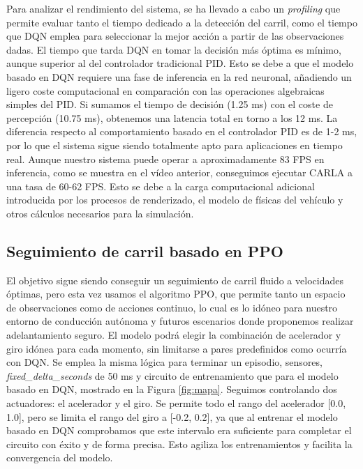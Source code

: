 Para analizar el rendimiento del sistema, se ha llevado a cabo un \textit{profiling} que permite evaluar tanto el tiempo dedicado a la detección del carril, como el tiempo que \ac{DQN} emplea para seleccionar la mejor acción a partir de las observaciones dadas. El tiempo que tarda \ac{DQN} en tomar la decisión más óptima es mínimo, aunque superior al del controlador tradicional \ac{PID}. Esto se debe a que el modelo basado en \ac{DQN} requiere una fase de inferencia en la red neuronal, añadiendo un ligero coste computacional en comparación con las operaciones algebraicas simples del \ac{PID}. Si sumamos el tiempo de decisión (1.25 ms) con el coste de percepción (10.75 ms), obtenemos una latencia total en torno a los 12 ms. La diferencia respecto al comportamiento basado en el controlador \ac{PID} es de 1-2 ms, por lo que el sistema sigue siendo totalmente apto para aplicaciones en tiempo real. Aunque nuestro sistema puede operar a aproximadamente 83 \ac{FPS} en inferencia, como se muestra en el vídeo anterior\footnotemark[3], conseguimos ejecutar CARLA a una tasa de 60-62 \ac{FPS}. Esto se debe a la carga computacional adicional introducida por los procesos de renderizado, el modelo de físicas del vehículo y otros cálculos necesarios para la simulación.

\subsection{Seguimiento de carril basado en \ac{PPO}}

El objetivo sigue siendo conseguir un seguimiento de carril fluido a velocidades óptimas, pero esta vez usamos el algoritmo \ac{PPO}, que permite tanto un espacio de observaciones como de acciones continuo, lo cual es lo idóneo para nuestro entorno de conducción autónoma y futuros escenarios donde proponemos realizar adelantamiento seguro. El modelo podrá elegir la combinación de acelerador y giro idónea para cada momento, sin limitarse a pares predefinidos como ocurría con \ac{DQN}. Se emplea la misma lógica para terminar un episodio, sensores, \textit{fixed\_delta\_seconds} de 50 ms y circuito de entrenamiento que para el modelo basado en \ac{DQN}, mostrado en la Figura \ref{fig:mapa}. Seguimos controlando dos actuadores: el acelerador y el giro. Se permite todo el rango del acelerador [0.0, 1.0], pero se limita el rango del giro a [-0.2, 0.2], ya que al entrenar el modelo basado en \ac{DQN} comprobamos que este intervalo era suficiente para completar el circuito con éxito y de forma precisa. Esto agiliza los entrenamientos y facilita la convergencia del modelo.

